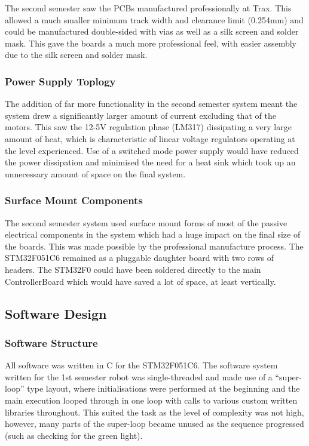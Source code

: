      The second semester saw the PCBs manufactured professionally at Trax. This allowed a much smaller minimum track width and clearance limit (0.254mm) and could be manufactured double-sided with vias as well as a silk screen and solder mask. This gave the boards a much more professional feel, with easier assembly due to the silk screen and solder mask.

    \subsubsection{Power Supply Toplogy}
    \label{subs:Power Supply Toplogy}
      The addition of far more functionality in the second semester system meant the system drew a significantly larger amount of current excluding that of the motors. This saw the 12-5V regulation phase (LM317) dissipating a very large amount of heat, which is characteristic of linear voltage regulators operating at the level experienced. Use of a switched mode power supply would have reduced the power dissipation and minimised the need for a heat sink which took up an unnecessary amount of space on the final system.

    \subsubsection{Surface Mount Components}
    \label{subs:Surface Mount Components}
      The second semester system used surface mount forms of most of the passive electrical components in the system which had a huge impact on the final size of the boards. This was made possible by the professional manufacture process. The STM32F051C6 remained as a pluggable daughter board with two rows of headers. The STM32F0 could have been soldered directly to the main ControllerBoard which would have saved a lot of space, at least vertically.

  \subsection{Software Design}
  \label{sub:Software Design}
    \subsubsection{Software Structure}
    \label{subs:Software Structure}
      All software was written in C for the STM32F051C6. The software system written for the 1st semester robot was single-threaded and made use of a ``super-loop'' type layout, where initialisations were performed at the beginning and the main execution looped through in one loop with calls to various custom written libraries throughout. This suited the task as the level of complexity was not high, however, many parts of the super-loop became unused as the sequence progressed (such as checking for the green light).\\

